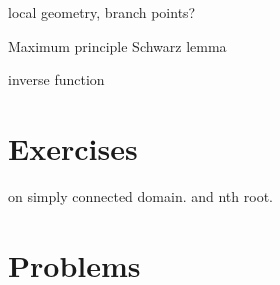\documentclass{../../large}
\begin{document}
\begin{prb}
\end{prb}


local geometry, branch points?

\begin{prb}
\end{prb}
Maximum principle
Schwarz lemma

\begin{prb}
\end{prb}
inverse function



\section*{Exercises}
\begin{prb}
\end{prb}
\begin{prb}
on simply connected domain.
and nth root.
\end{prb}
\begin{prb}
\end{prb}


\section*{Problems}
\end{document}
